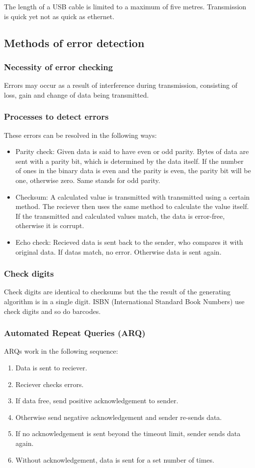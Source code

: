 \documentclass{article}
\begin{document}
The length of a USB cable is limited to a maximum of five metres. Transmission is quick
yet not as quick as ethernet.

\subsection{Methods of error detection}
\subsubsection{Necessity of error checking}
Errors may occur as a result of interference during transmission, consisting of loss, gain
and change of data being transmitted.

\subsubsection{Processes to detect errors}
These errors can be resolved in the following ways:
\begin{itemize}
	\item Parity check: Given data is said to have even or odd parity. Bytes of data are
		sent with a parity bit, which is determined by the data itself. If the number of
		ones in the binary data is even and the parity is even, the parity bit will be 
		one, otherwise zero. Same stands for odd parity.
	\item Checksum: A calculated value is transmitted with transmitted using a certain
		method. The reciever then uses the same method to calculate the value itself.
		If the transmitted and calculated values match, the data is error-free, otherwise
		it is corrupt.
	\item Echo check: Recieved data is sent back to the sender, who compares it with 
		original data. If datas match, no error. Otherwise data is sent again.
\end{itemize}

\subsubsection{Check digits}
Check digits are identical to checksums but the the result of the generating algorithm
is in a single digit. ISBN (International Standard Book Numbers) use check digits and
so do barcodes.

\subsubsection{Automated Repeat Queries (ARQ)}
ARQs work in the following sequence:
\begin{enumerate}
	\item Data is sent to reciever.
	\item Reciever checks errors.
	\item If data free, send positive acknowledgement to sender.
	\item Otherwise send negative acknowledgement and sender re-sends data.
	\item If no acknowledgement is sent beyond the timeout limit, sender sends data again.
	\item Without acknowledgement, data is sent for a set number of times.
\end{enumerate}
\end{document}
